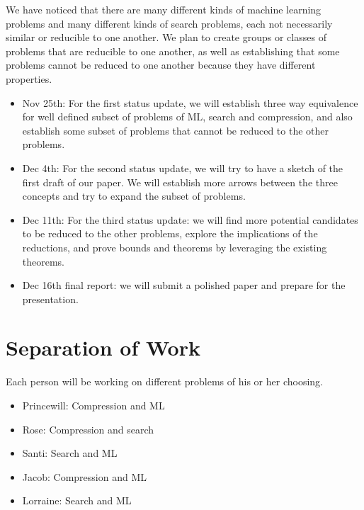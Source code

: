 \documentclass[12pt]{article}
\begin{document}
We have noticed that there are many different kinds of machine learning problems and many different 
kinds of search problems, each not necessarily similar or reducible to one another.
We plan to create groups or classes of problems that are reducible to one another,
as well as establishing that some problems cannot be reduced to one another because 
they have different properties.

\begin{itemize}
\item
Nov 25th: For the first status update, we will establish three way equivalence for well defined subset of problems of ML, search and compression, and also establish some subset of problems that cannot be reduced to the other problems.
\item
Dec 4th: For the second status update, we will try to have a sketch of the first draft of our paper. We will establish more arrows between the three concepts and try to expand the subset of problems.
\item
Dec 11th: For the third status update: we will find more potential candidates to be reduced to the other problems, explore the implications of the reductions, and prove bounds and theorems by leveraging the existing theorems.
\item
Dec 16th final report:  we will submit a polished paper and prepare for the presentation.
\end{itemize}

\section{Separation of Work}

Each person will be working on different problems of his or her choosing.

\begin{itemize}
\item
Princewill: Compression and ML
\item
Rose: Compression and search
\item
Santi: Search and ML
\item
Jacob: Compression and ML
\item
Lorraine: Search and ML
\end{itemize}
\end{document}
